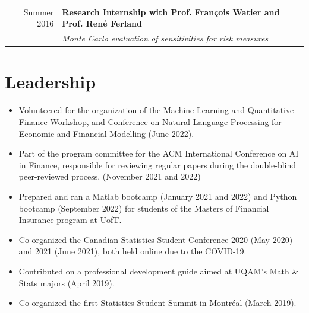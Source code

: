 \documentclass[11pt, sans]{moderncv}
\begin{document}
\begin{longtable}{rp{13.34cm}}
	Summer 2016 \hspace{10pt}& \textbf{Research Internship with Prof. François Watier and Prof. René Ferland} \\
	&\textit{Monte Carlo evaluation of sensitivities for risk measures}\\
\end{longtable}


\section{Leadership  }

\begin{itemize}
	\item Volunteered for the organization of the Machine Learning and Quantitative Finance Workshop, and Conference on Natural Language Processing for Economic and Financial Modelling (June 2022).
	\vspace{5pt}

	\item Part of the program committee for the ACM International Conference on AI in Finance, responsible for reviewing regular papers during the double-blind peer-reviewed process. (November 2021 and 2022)
	\vspace{5pt}
	
	\item Prepared and ran a Matlab bootcamp (January 2021 and 2022) and Python bootcamp (September 2022) for students of the Masters of Financial Insurance program at UofT.
	\vspace{5pt}
	
	\item Co-organized the Canadian Statistics Student Conference 2020 (May 2020) and 2021 (June 2021), both held online due to the COVID-19.
	\vspace{5pt}
	
	\item Contributed on a professional development guide aimed at UQAM's Math \& Stats majors (April 2019).
	\vspace{5pt}
	
	\item Co-organized the first Statistics Student Summit in Montréal (March 2019).
	\vspace{5pt}
	

\end{itemize}
\end{document}
